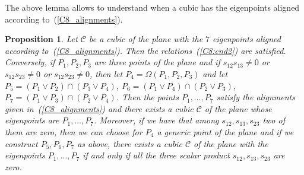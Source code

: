 \documentclass{amsart}
\theoremstyle{plain}
\newtheorem{prop}[lemma]{Proposition}
\theoremstyle{definition}
\begin{document}
%
The above lemma allows to understand when a cubic has the eigenpoints
aligned according to~(\ref{C8_alignments}).
%
\begin{prop}
  Let $\mathcal{C}$ be a cubic of the plane with the $7$ eigenpoints
  aligned according to~(\ref{C8_alignments}).
  Then the relations~(\ref{C8:cnd2}) are satisfied.
  Conversely, if $P_1, P_2, P_3$ are three points of the plane
  and if $s_{12}s_{13} \not = 0$ or $s_{12}s_{23} \not = 0$ or
  $s_{12}s_{23} \not = 0$, then let $P_4 = \Omega(P_1, P_2, P_3)$
  and let $P_5 = (P_1\vee P_2) \cap (P_3\vee P_4)$,
  $P_6 = (P_1\vee P_4) \cap (P_2\vee P_3)$, $P_7 = (P_1\vee P_3) \cap (P_2\vee P_4)$.
  Then the points $P_1, \dots, P_7$ satisfy the alignments given
  in~(\ref{C8_alignments}) and there exists a cubic $\mathcal{C}$
  of the plane whose eigenpoints are $P_1, \dots, P_7$. Moreover, if
  we have that among $s_{12}, s_{13}, s_{23}$ two of them are zero,
  then we can choose for $P_4$ a generic point of the plane and if we construct
  $P_5, P_6, P_7$ as above, there exists a cubic $\mathcal{C}$ of the
  plane with the eigenpoints $P_1, \dotsc, P_7$ if and only if
  all the three scalar product $s_{12}, s_{13}, s_{23}$ are zero.
\end{prop}
%
\end{document}
